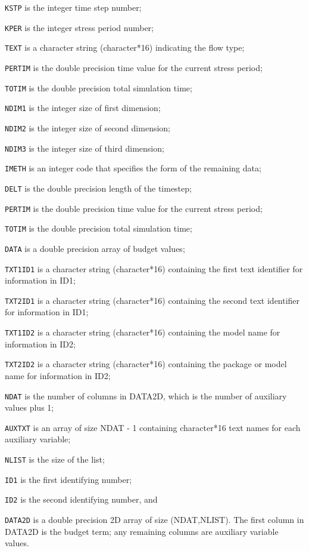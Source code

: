 \begin{description} \itemsep0pt \parskip0pt 
\item \texttt{KSTP} is the integer time step number;
\item \texttt{KPER} is the integer stress period number;
\item \texttt{TEXT} is a character string (character*16) indicating the flow type;
\item \texttt{PERTIM} is the double precision time value for the current stress period; 
\item \texttt{TOTIM} is the double precision total simulation time;
\item \texttt{NDIM1} is the integer size of first dimension; 
\item \texttt{NDIM2} is the integer size of second dimension;
\item \texttt{NDIM3} is the integer size of third dimension;
\item \texttt{IMETH} is an integer code that specifies the form of the remaining data;
\item \texttt{DELT} is the double precision length of the timestep;
\item \texttt{PERTIM} is the double precision time value for the current stress period;
\item \texttt{TOTIM} is the double precision total simulation time;
\item \texttt{DATA} is a double precision array of budget values;
\item \texttt{TXT1ID1} is a character string (character*16) containing the first text identifier for information in ID1;
\item \texttt{TXT2ID1} is a character string (character*16) containing the second text identifier for information in ID1;
\item \texttt{TXT1ID2} is a character string (character*16) containing the model name for information in ID2;
\item \texttt{TXT2ID2} is a character string (character*16) containing the package or model name for information in ID2;
\item \texttt{NDAT} is the number of columns in DATA2D, which is the number of auxiliary values plus 1;
\item \texttt{AUXTXT} is an array of size NDAT - 1 containing character*16 text names for each auxiliary variable;
\item \texttt{NLIST} is the size of the list;
\item \texttt{ID1} is the first identifying number;
\item \texttt{ID2} is the second identifying number, and
\item \texttt{DATA2D} is a double precision 2D array of size (NDAT,NLIST).  The first column in DATA2D is the budget term; any remaining columns are auxiliary variable values.
\end{description}


